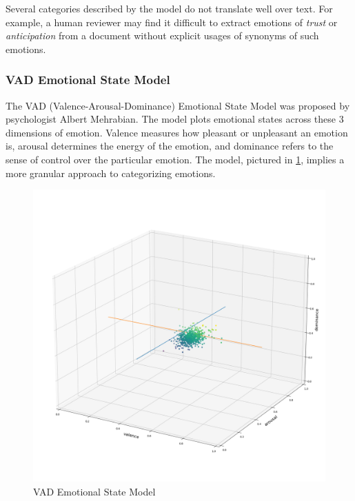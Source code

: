 \documentclass[11pt]{article}
\begin{document}

Several categories described by the model do not translate well over text. For example, a human reviewer may find it difficult to extract emotions of \textit{trust} or \textit{anticipation} from a document without explicit usages of synonyms of such emotions.

\subsubsection{VAD Emotional State Model}

The VAD (Valence-Arousal-Dominance) Emotional State Model was proposed by psychologist Albert Mehrabian. The model plots emotional states across these 3 dimensions of emotion. Valence measures how pleasant or unpleasant an emotion is, arousal determines the energy of the emotion, and dominance refers to the sense of control over the particular emotion. The model, pictured in \ref{fig:vad}, implies a more granular approach to categorizing emotions.

\begin{figure}[!ht]
  \includegraphics[scale=0.45]{../statics/vad.png}
  \centering
  \caption{VAD Emotional State Model}
  \label{fig:vad}
\end{figure}
\end{document}
